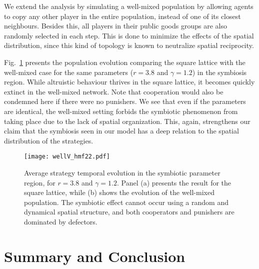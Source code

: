 \documentclass[5p]{elsarticle}
\begin{document}
{We extend the analysis by simulating a well-mixed population by allowing agents to copy any other player in the entire population, instead of one of its closest neighbours. Besides this, all players in their public goods groups are also randomly selected in each step. This is done to minimize the effects of the spatial distribution, since this kind of topology is known to neutralize spatial reciprocity.} 

Fig.~\ref{fig-well-mixed} presents the population evolution comparing the square lattice with the well-mixed case for the same parameters ($r=3.8$ and $\gamma=1.2$) in the symbiosis region. While altruistic behaviour thrives in the square lattice, it becomes quickly extinct in the well-mixed network. Note that cooperation would also be condemned here if there were no punishers.
%
We see that even if the parameters are identical, the well-mixed setting forbids the symbiotic phenomenon from taking place due to the lack of spatial organization. This, again, strengthens our claim that the symbiosis seen in our model has a deep relation to the spatial distribution of the strategies.

\begin{figure}%
\begin{center}
\texttt{[image: wellV\_hmf22.pdf]}
\caption{Average strategy temporal evolution in the symbiotic parameter region, for $r=3.8$ and $\gamma=1.2$. Panel (a) presents the result for the square lattice, while (b) shows the evolution of the well-mixed population. { The symbiotic effect cannot occur using a random and dynamical spatial structure}, and both cooperators and punishers are dominated by defectors.}
\label{fig-well-mixed}
\end{center}
\end{figure}



\section{Summary and Conclusion}
\end{document}
